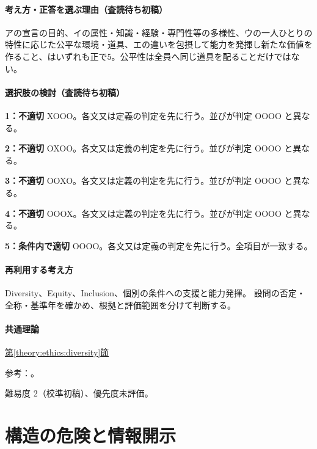 \paragraph{考え方・正答を選ぶ理由（査読待ち初稿）} アの宣言の目的、イの属性・知識・経験・専門性等の多様性、ウの一人ひとりの特性に応じた公平な環境・道具、エの違いを包摂して能力を発揮し新たな価値を作ること、はいずれも正で5。公平性は全員へ同じ道具を配ることだけではない。

\paragraph{選択肢の検討（査読待ち初稿）}\mbox{}\par

\noindent\textbf{1：不適切} XOOO。各文又は定義の判定を先に行う。並びが判定 OOOO と異なる。\par

\noindent\textbf{2：不適切} OXOO。各文又は定義の判定を先に行う。並びが判定 OOOO と異なる。\par

\noindent\textbf{3：不適切} OOXO。各文又は定義の判定を先に行う。並びが判定 OOOO と異なる。\par

\noindent\textbf{4：不適切} OOOX。各文又は定義の判定を先に行う。並びが判定 OOOO と異なる。\par

\noindent\textbf{5：条件内で適切} OOOO。各文又は定義の判定を先に行う。全項目が一致する。\par

\paragraph{再利用する考え方} Diversity、Equity、Inclusion、個別の条件への支援と能力発揮。 設問の否定・全称・基準年を確かめ、根拠と評価範囲を分けて判断する。

\paragraph{共通理論} \hyperref[theory:ethics:diversity]{第\ref*{theory:ethics:diversity}節}

\par 参考：\cite{eth54_dei2025}。

\par 難易度 2（校準初稿）、優先度未評価。

\section{構造の危険と情報開示}


